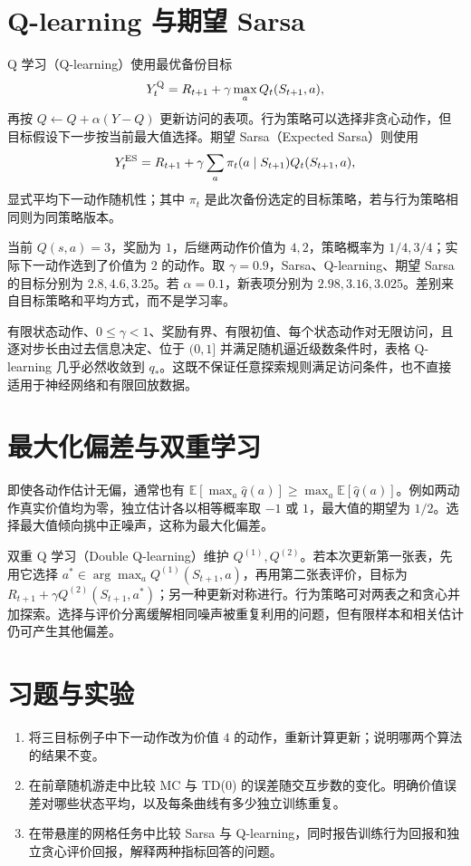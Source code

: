 \documentclass[UTF8,12pt,a4paper,fontset=fandol]{ctexbook}
\begin{document}
\section{Q-learning 与期望 Sarsa}

Q 学习（Q-learning）使用最优备份目标
\[
Y_t^{\rm Q}=R_{t+1}+\gamma\max_aQ_t(S_{t+1},a),
\]
再按 $Q\leftarrow Q+\alpha(Y-Q)$ 更新访问的表项。行为策略可以选择非贪心动作，但目标假设下一步按当前最大值选择。期望 Sarsa（Expected Sarsa）则使用
\[
Y_t^{\rm ES}=R_{t+1}+\gamma\sum_a\pi_t(a\mid S_{t+1})Q_t(S_{t+1},a),
\]
显式平均下一动作随机性；其中 $\pi_t$ 是此次备份选定的目标策略，若与行为策略相同则为同策略版本。

\begin{example}
当前 $Q(s,a)=3$，奖励为 $1$，后继两动作价值为 $4,2$，策略概率为 $1/4,3/4$；实际下一动作选到了价值为 $2$ 的动作。取 $\gamma=0.9$，Sarsa、Q-learning、期望 Sarsa 的目标分别为 $2.8,4.6,3.25$。若 $\alpha=0.1$，新表项分别为 $2.98,3.16,3.025$。差别来自目标策略和平均方式，而不是学习率。
\end{example}

有限状态动作、$0\leq\gamma<1$、奖励有界、有限初值、每个状态动作对无限访问，且逐对步长由过去信息决定、位于 $(0,1]$ 并满足随机逼近级数条件时，表格 Q-learning 几乎必然收敛到 $q_*$\cite{watkins-qlearning}。这既不保证任意探索规则满足访问条件，也不直接适用于神经网络和有限回放数据。

\section{最大化偏差与双重学习}

即使各动作估计无偏，通常也有 $\mathbb E[\max_a\widehat q(a)]\geq\max_a\mathbb E[\widehat q(a)]$。例如两动作真实价值均为零，独立估计各以相等概率取 $-1$ 或 $1$，最大值的期望为 $1/2$。选择最大值倾向挑中正噪声，这称为最大化偏差。

双重 Q 学习（Double Q-learning）维护 $Q^{(1)},Q^{(2)}$。若本次更新第一张表，先用它选择 $a^*\in\arg\max_aQ^{(1)}(S_{t+1},a)$，再用第二张表评价，目标为 $R_{t+1}+\gamma Q^{(2)}(S_{t+1},a^*)$；另一种更新对称进行。行为策略可对两表之和贪心并加探索。选择与评价分离缓解相同噪声被重复利用的问题，但有限样本和相关估计仍可产生其他偏差。

\section{习题与实验}
\begin{enumerate}
\item 将三目标例子中下一动作改为价值 $4$ 的动作，重新计算更新；说明哪两个算法的结果不变。
\item 在前章随机游走中比较 MC 与 TD(0) 的误差随交互步数的变化。明确价值误差对哪些状态平均，以及每条曲线有多少独立训练重复。
\item 在带悬崖的网格任务中比较 Sarsa 与 Q-learning，同时报告训练行为回报和独立贪心评价回报，解释两种指标回答的问题。
\end{enumerate}
\end{document}
